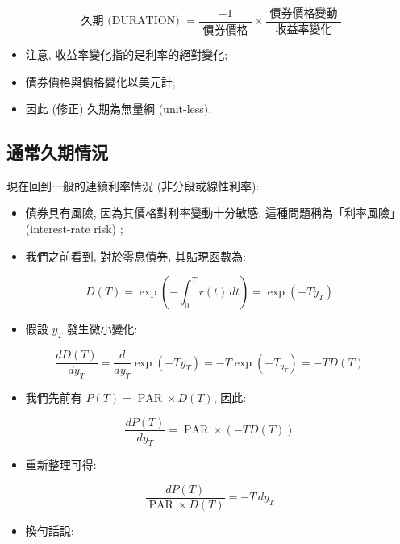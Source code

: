 \documentclass[letterpaper]{article}
\begin{document}
		$$
		\text{ 久期 (DURATION) } = \frac{-1}{\text{ 債券價格 }} \times \frac{\text{ 債券價格變動 }}{\text{ 收益率變化 }}
		$$
		
		\begin{itemize}
			\item 注意, 收益率變化指的是利率的絕對變化; 
			\item 債券價格與價格變化以美元計; 
			\item 因此 (修正) 久期為無量綱 (unit-less).  
		\end{itemize}
		
		
		\subsection{通常久期情況}
		現在回到一般的連續利率情況 (非分段或線性利率): 
		
		\begin{itemize}
			\item 債券具有風險, 因為其價格對利率變動十分敏感, 這種問題稱為「利率風險」 (interest-rate risk) ; 
			\item 我們之前看到, 對於零息債券, 其貼現函數為: 
		\end{itemize}
		
		$$
		D (T) = \exp\!\left (-\int_{0}^{T} r (t) \, dt\right) = \exp (-T y_{T}) 
		$$
		
		\begin{itemize}
			\item 假設 $y_{T}$ 發生微小變化: 
		\end{itemize}
		
		
		$$
		\frac{d D (T) }{d y_{T}}=\frac{d}{d y_{T}} \exp \left (-T y_{T}\right) =-T \exp \left (-T_{y_{T}}\right) =-T D (T) 
		$$
		\begin{itemize}
			\item 我們先前有 $P (T) = \operatorname{PAR} \times D (T) $, 因此: 
		\end{itemize}
		
		$$
		\frac{dP (T) }{dy_{T}} = \operatorname{PAR} \times \left (-T D (T) \right) 
		$$
		
		\begin{itemize}
			\item 重新整理可得: 
		\end{itemize}
		
		$$
		\frac{dP (T) }{\operatorname{PAR} \times D (T) } = -T\, dy_{T}
		$$
		
		\begin{itemize}
			\item 換句話說: 
		\end{itemize}
		
\end{document}
